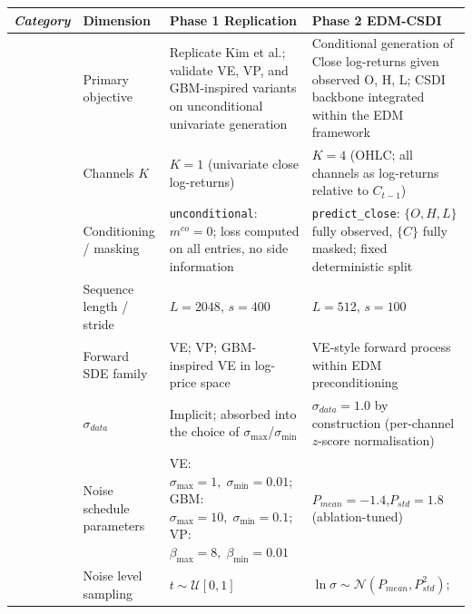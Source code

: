 \begin{table}[htbp]
\centering
\footnotesize
\renewcommand{\arraystretch}{1.35}
\setlength{\tabcolsep}{5pt}
\begin{tabular}{
  >{\itshape}p{2.0cm}
  p{3.3cm}
  p{4.65cm}
  p{4.65cm}
}
\toprule
\normalfont\textbf{Category}
  & \textbf{Dimension}
  & \textbf{Phase 1 \textemdash{} Replication}
  & \textbf{Phase 2 \textemdash{} EDM-CSDI} \\
\midrule
\multirow{4}{2.0cm}{Problem setup}
  & Primary objective
  & Replicate Kim et al.\cite{kim2025diffusion}; validate VE, VP, and GBM-inspired
    variants on unconditional univariate generation
  & Conditional generation of Close log-returns given observed O, H, L;
    CSDI backbone integrated within the EDM framework \\[3pt]
  & Channels $K$
  & $K=1$ (univariate close log-returns)
  & $K=4$ (OHLC; all channels as log-returns relative to $C_{t-1}$) \\[3pt]
  & Conditioning / masking
  & \texttt{unconditional}: $m^{co}=0$; loss computed on all
    entries, no side information
  & \texttt{predict\_close}: $\{O,H,L\}$ fully observed, $\{C\}$ fully
    masked; fixed deterministic split \\[3pt]
  & Sequence length / stride
  & $L=2048$,\; $s=400$
  & $L=512$,\; $s=100$ \\
\midrule
\multirow{4}{2.0cm}{Diffusion process}
  & Forward SDE family
  & VE; VP;
    GBM-inspired VE in log-price space
  & VE-style forward process within EDM preconditioning\\[3pt]
  & $\sigma_{data}$
  & Implicit; absorbed into the choice of $\sigma_{\max}$/$\sigma_{\min}$
  & $\sigma_{data}=1.0$ by construction
    (per-channel $z$-score normalisation) \\[3pt]
  & Noise schedule parameters
  & VE: $\sigma_{\max}{=}1,\;\sigma_{\min}{=}0.01$;\;
    GBM: $\sigma_{\max}{=}10,\;\sigma_{\min}{=}0.1$;\;
    VP: $\beta_{\max}{=}8,\;\beta_{\min}{=}0.01$
  & $P_{mean}{=}{-1.4}$,\;$P_{std}{=}1.8$
    (ablation-tuned) \\[3pt]
  & Noise level sampling
  & $t\sim\mathcal{U}[0,1]$
  & $\ln\sigma\sim\mathcal{N}(P_{mean},P_{std}^{2})$;\\
\midrule

\end{tabular}
\end{table}
